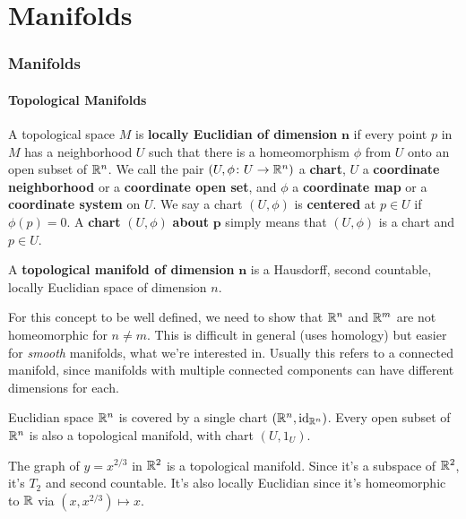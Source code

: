 \part{Manifolds}
\section{Manifolds}
\subsection{Topological Manifolds}

\begin{definition}[]
    A topological space $M$ is \textbf{locally Euclidian of dimension} $\mathbf n$ if every point $p$ in $M$ has a neighborhood $U$ such that there is a homeomorphism  $\phi$ from $U$ onto an open subset of $\mathbb{R}^n $. We call the pair $(U, \phi \colon U \to \mathbb{R}^n )$ a \textbf{chart}, $U$ a \textbf{coordinate neighborhood} or a \textbf{coordinate open set}, and $\phi$ a \textbf{coordinate map} or a \textbf{coordinate system} on $U$. We say a chart $(U, \phi)$ is \textbf{centered} at $p \in U$ if $\phi(p)=0$. A \textbf{chart} $(U,\phi)$ \textbf{about} $\mathbf p$ simply means that $(U, \phi)$ is a chart and $p \in U$.
\end{definition}
\begin{definition}[]
    A \textbf{topological manifold of dimension} $\mathbf n$ is a Hausdorff, second countable, locally Euclidian space of dimension $n$.
\end{definition}
For this concept to be well defined, we need to show that $\mathbb{R}^n $ and $\mathbb{R}^m$ are not homeomorphic for $n \neq m$. This is difficult in general (uses homology) but easier for \emph{smooth} manifolds, what we're interested in. Usually this refers to a connected manifold, since manifolds with multiple connected components can have different dimensions for each.
\begin{example}
    Euclidian space $\mathbb{R}^n $ is covered by a single chart $(\mathbb{R}^n , \operatorname{id}_{\mathbb{R}^n })$. Every open subset of $\mathbb{R}^n $ is also a topological manifold, with chart $(U, 1_U)$.
\end{example}
\begin{example}
    The graph of $y = x^{2 /3}$ in $\mathbb{R}^2$ is a topological manifold. Since it's a subspace of $\mathbb{R}^2$, it's $T_2$ and second countable. It's also locally Euclidian since it's homeomorphic to $\mathbb{R}$ via $(x,x^{2 /3})\mapsto  x$.
\end{example}

